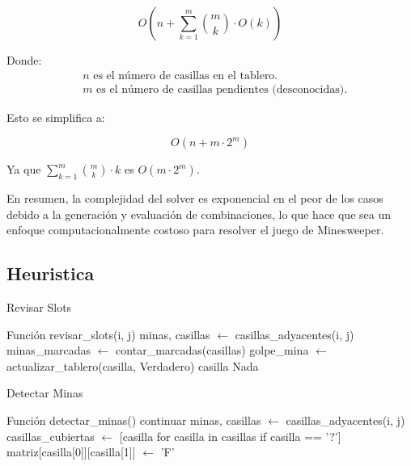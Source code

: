 \documentclass{article}
\begin{document}
\[
O(n + \sum_{k=1}^{m} \binom{m}{k} \cdot O(k))
\]

Donde:
\begin{align*}
& n \text{ es el número de casillas en el tablero.} \\
& m \text{ es el número de casillas pendientes (desconocidas).}
\end{align*}

Esto se simplifica a:

\[
O(n + m \cdot 2^m)
\]

Ya que $\sum_{k=1}^{m} \binom{m}{k} \cdot k$ es $O(m \cdot 2^m)$.

En resumen, la complejidad del solver es exponencial en el peor de los casos debido a la generación y evaluación de combinaciones, lo que hace que sea un enfoque computacionalmente costoso para resolver el juego de Minesweeper.

\subsection{Heuristica}

\begin{algorithm}[H]
\caption{Revisar Slots}
\begin{algorithmic}[1]
\STATE Función revisar\_slots(i, j)
\STATE minas, casillas $\leftarrow$ casillas\_adyacentes(i, j)
\STATE minas\_marcadas $\leftarrow$ contar\_marcadas(casillas)
\STATE golpe\_mina $\leftarrow$ actualizar\_tablero(casilla, Verdadero)
\RETURN casilla
\ENDIF
\ENDIF
\ENDFOR
\ENDIF
\RETURN Nada
\end{algorithmic}
\end{algorithm}

\begin{algorithm}[H]
\caption{Detectar Minas}
\begin{algorithmic}[1]
\STATE Función detectar\_minas()
\STATE continuar
\ENDIF
\STATE minas, casillas $\leftarrow$ casillas\_adyacentes(i, j)
\STATE casillas\_cubiertas $\leftarrow$ [casilla for casilla in casillas if casilla == '?']
\STATE matriz[casilla[0]][casilla[1]] $\leftarrow$ 'F'
\ENDFOR
\ENDIF
\ENDFOR
\end{algorithmic}
\end{algorithm}
\end{document}
